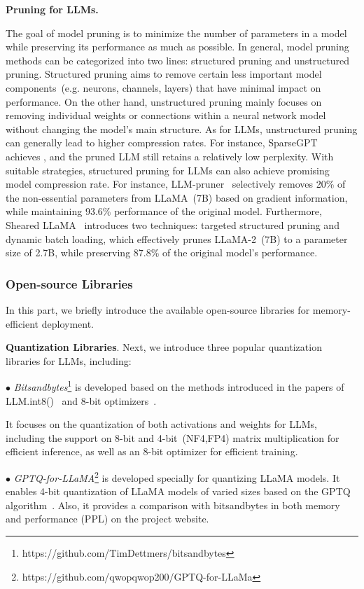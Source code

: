 {{\textbf{Pruning for LLMs.} {The goal of model pruning is to minimize the number of parameters in a model while preserving its performance as much as possible. In general, model pruning methods can be categorized into two lines: structured pruning and unstructured pruning. Structured pruning aims to remove certain less important model components~(e.g. neurons, channels, layers) that have minimal impact on performance. On the other hand, unstructured pruning mainly focuses on {removing individual weights or connections within a neural network model} without changing the model's main structure. As for LLMs, unstructured pruning can generally lead to higher compression rates. For instance, SparseGPT~\cite{Frantar-ICLR-2024-Sparsegpt} achieves , and the pruned LLM still retains a relatively low perplexity. {With suitable strategies, structured pruning for LLMs can also  achieve promising model compression rate.} For instance, LLM-pruner~\cite{Ma-NIPS-2023-Llm-pruner} {selectively removes 20\% of the non-essential parameters from LLaMA~(7B) based on gradient information}, while maintaining 93.6\% performance of the original model. Furthermore, Sheared LLaMA~\cite{Xia-CORR-2023-Sheared} {introduces two techniques: targeted structured pruning and dynamic batch loading, which effectively prunes LLaMA-2~(7B) to a parameter size of 2.7B, while preserving 87.8\% of the original model's performance.}

\subsubsection{Open-source Libraries} 

In this part, we briefly introduce the available open-source   libraries for memory-efficient deployment.

\textbf{Quantization Libraries}. Next, we introduce three popular quantization libraries for LLMs, including:  

$\bullet$ \emph{Bitsandbytes}\footnote{https://github.com/TimDettmers/bitsandbytes} is developed based on the methods introduced in the papers of LLM.int8()~\cite{Dettmers-arxiv-2022-LLM} and 8-bit optimizers~\cite{Dettmers-ICLR-2022-8bit}. 

{It focuses on the quantization of both activations and weights for LLMs, including the support on 8-bit and 4-bit~(NF4,FP4) matrix multiplication for efficient inference, as well as an 8-bit optimizer for efficient training.}

$\bullet$ \emph{GPTQ-for-LLaMA}\footnote{https://github.com/qwopqwop200/GPTQ-for-LLaMa} is  developed specially for quantizing LLaMA models. It enables 4-bit quantization of LLaMA models of varied sizes based on the GPTQ algorithm~\cite{frantar-arxiv-2022-gptq}. Also, it provides a comparison with bitsandbytes in both memory and performance (PPL) on the project website. 

}}}
